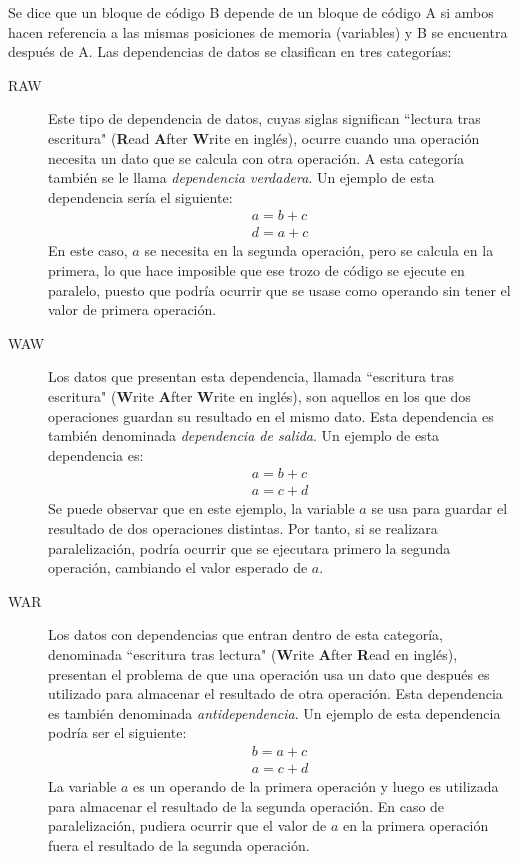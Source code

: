 \documentclass[11pt,twoside,a4paper]{article}
\begin{document}
Se dice que un bloque de código B depende de un bloque de código A si ambos hacen referencia a las mismas
posiciones de memoria (variables) y B se encuentra después de A. Las dependencias de datos se clasifican
en tres categorías:
\begin{description}
	\item [RAW] Este tipo de dependencia de datos, cuyas siglas significan ``lectura tras escritura" 
	(\textbf Read \textbf After \textbf Write en inglés), ocurre cuando una operación necesita un dato que
	se calcula con otra operación. A esta categoría también se le llama \textit{dependencia verdadera}. Un
	ejemplo de esta dependencia sería el siguiente:
	\begin{gather*}
		a = b + c\\
		d = a + c
	\end{gather*}
	En este caso, $a$ se necesita en la segunda operación, pero se calcula en la primera, lo que
	hace imposible que ese trozo de código se ejecute en paralelo, puesto que podría ocurrir que se usase
	como operando sin tener el valor de primera operación.
	\item [WAW] Los datos que presentan esta dependencia, llamada ``escritura tras escritura" (\textbf
	Write \textbf After \textbf Write en inglés), son aquellos en los que dos operaciones guardan su
	resultado en el mismo dato. Esta dependencia es también denominada \textit{dependencia de salida}. Un
	ejemplo de esta dependencia es:
	\begin{gather*}
		a = b + c\\
		a = c + d
	\end{gather*}
	Se puede observar que en este ejemplo, la variable $a$ se usa para guardar el resultado de dos
	operaciones distintas. Por tanto, si se realizara paralelización, podría ocurrir que se ejecutara
	primero la segunda operación, cambiando el valor esperado de $a$.
	\item [WAR] Los datos con dependencias que entran dentro de esta categoría, denominada ``escritura tras
	lectura" (\textbf Write \textbf After \textbf Read en inglés), presentan el problema de que una
	operación usa un dato que después es utilizado para almacenar el resultado de otra operación. Esta
	dependencia es también denominada \textit{antidependencia}. Un ejemplo de esta dependencia podría ser
	el siguiente:
	\begin{gather*}
		b = a + c\\
		a = c + d
	\end{gather*}
	La variable $a$ es un operando de la primera operación y luego es utilizada para almacenar el
	resultado de la segunda operación. En caso de paralelización, pudiera ocurrir que el valor de $a$ en
	la primera operación fuera el resultado de la segunda operación.
\end{description}
\end{document}
